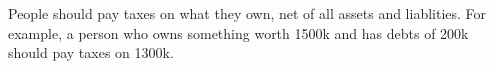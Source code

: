 People should pay taxes on what they own, net of all assets and liablities. For example, a person who owns something worth 1500k and has debts of 200k should pay taxes on 1300k.
